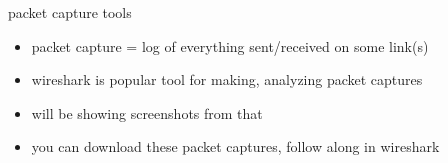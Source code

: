 \begin{frame}{packet capture tools}
    \begin{itemize}
    \item packet capture = log of everything sent/received on some link(s)
    \item wireshark is popular tool for making, analyzing packet captures
    \vspace{.5cm}
    \item will be showing screenshots from that
    \vspace{.5cm}
    \item you can download these packet captures, follow along in wireshark
    \end{itemize}
\end{frame}
